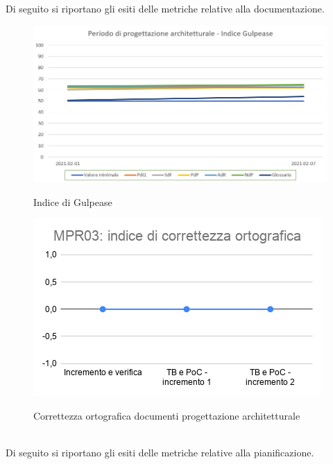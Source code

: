 Di seguito si riportano gli esiti delle metriche relative alla documentazione.
\begin{figure}[h]
	\centering
	\includegraphics[scale=0.5]{Immagini/GulpeaseProgettazioneArchitetturale}\\
	\caption{Indice di Gulpease}
	\label{fig:GulpeasePArchitetturale}
\end{figure}
\begin{figure}[h]
	\centering
	\includegraphics[scale=0.6]{Immagini/MPR03_cortografica}\\
	\caption{Correttezza ortografica documenti progettazione architetturale}
	\label{fig:CortOrtograficaPArchitetturale}
\end{figure}
\\
Di seguito si riportano gli esiti delle metriche relative alla pianificazione.
